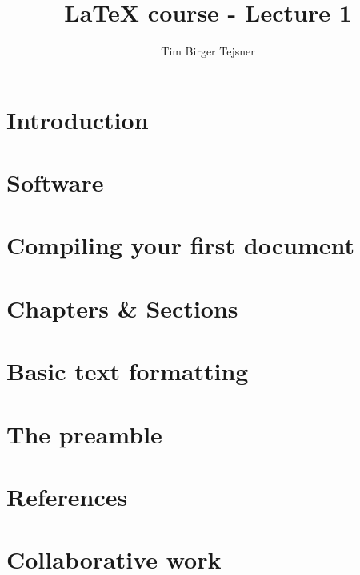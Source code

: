 \documentclass[pdf]{beamer}
\title{\LaTeX{} course - Lecture 1}
\author[Tim Tejsner]{Tim Birger Tejsner}
\institute[RUC]{Roskilde University}
\begin{document}
\begin{frame}
\titlepage
\end{frame}

\begin{frame}
\tableofcontents
\end{frame}

\section{Introduction}
\section{Software}
\section{Compiling your first document}
\section{Chapters \& Sections}
\section{Basic text formatting}
\section{The preamble}
\section{References}
\section{Collaborative work}
\end{document}
